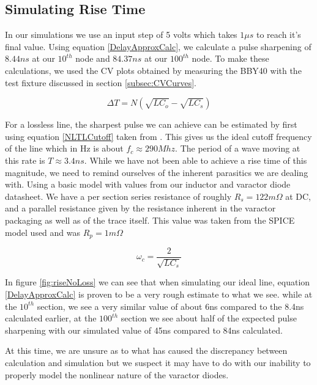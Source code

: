 \documentclass[journal]{IEEEtran} \usepackage[english]{babel}
\begin{document}
\subsection{Simulating Rise Time}

In our simulations we use an input step of 5 volts which takes $1\mu s$ to reach
it's final value. Using equation \ref{DelayApproxCalc}, we calculate a pulse
sharpening of $8.44ns$ at our $10^{th}$ node and $84.37ns$ at our $100^{th}$
node. To make these calculations, we used the CV plots obtained by measuring the
BBY40 with the test fixture discussed in section \ref{subsec:CVCurves}.


\begin{equation} \label{DelayApproxCalc}
    \Delta T = N(\sqrt{LC_{o}} - \sqrt{LC_{s}} )
\end{equation}

For a lossless line, the sharpest pulse we can achieve can be estimated by first
using equation \ref{NLTLCutoff} taken from \cite{wilson1991pulse}. This gives us
the ideal cutoff frequency of the line which in Hz is about $f_c \approx
290Mhz$. The period of a wave moving at this rate is $T \approx 3.4ns$. While we
have not been able to achieve a rise time of this magnitude, we need to remind
ourselves of the inherent parasitics we are dealing with. Using a basic model
with values from our inductor and varactor diode datasheet. We have a per
section series resistance of roughly $R_s = 122m\Omega$ at DC, and a parallel
resistance given by the resistance inherent in the varactor packaging as well as
of the trace itself. This value was taken from the SPICE model used and was
$R_{p} = 1m\Omega$

\begin{equation} \label{NLTLCutoff}
    \omega_{c} = \frac{2}{\sqrt{ LC_{s} } }
\end{equation}

In figure \ref{fig:riseNoLoss} we can see that when simulating our ideal line,
equation \ref{DelayApproxCalc} is proven to be a very rough estimate to what we
see. while at the $10^{th}$ section, we see a very similar value of about 6ns
compared to the 8.4ns calculated earlier, at the $100^{th}$ section we see about
half of the expected pulse sharpening with our simulated value of 45ns compared
to 84ns calculated.

At this time, we are unsure as to what has caused the discrepancy between
calculation and simulation but we suspect it may have to do with our inability
to properly model the nonlinear nature of the varactor diodes.
\end{document}
